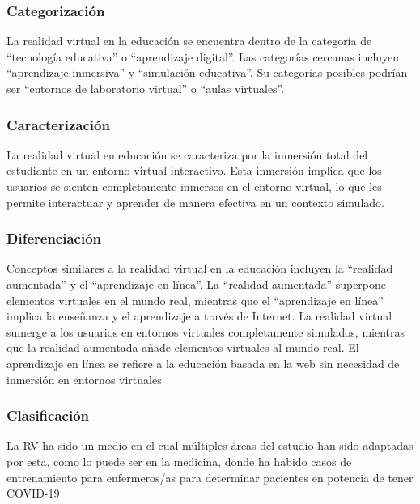 \subsubsection{Categorización}

La realidad virtual en la educación se encuentra dentro de la categoría de “tecnología educativa” o “aprendizaje digital”. Las categorías cercanas incluyen “aprendizaje inmersiva” y “simulación educativa”. Su categorías posibles podrían ser “entornos de laboratorio virtual” o “aulas virtuales”. \parencite{barahona2019cospaces, marin2022realidad}

\subsubsection{Caracterización}

La realidad virtual en educación se caracteriza por la inmersión total del estudiante en un entorno virtual interactivo. Esta inmersión implica que los usuarios se sienten completamente inmersos en el entorno virtual, lo que les permite interactuar y aprender de manera efectiva en un contexto simulado. \parencite{zamudio2021realidad}

\subsubsection{Diferenciación}

Conceptos similares a la realidad virtual en la educación incluyen la “realidad aumentada” y el “aprendizaje en línea”. La “realidad aumentada” superpone elementos virtuales en el mundo real, mientras que el “aprendizaje en línea” implica la enseñanza y el aprendizaje a través de Internet. La realidad virtual sumerge a los usuarios en entornos virtuales completamente simulados, mientras que la realidad aumentada añade elementos virtuales al mundo real. El aprendizaje en línea se refiere a la educación basada en la web sin necesidad de inmersión en entornos virtuales \parencite{garcia2020}

\subsubsection{Clasificación}

La RV ha sido un medio en el cual múltiples áreas del estudio han sido adaptadas por esta, como lo puede ser en la medicina, donde ha habido casos de entrenamiento para enfermeros/as para determinar pacientes en potencia de tener COVID-19 \parencite{GUERRERO2022100002}

